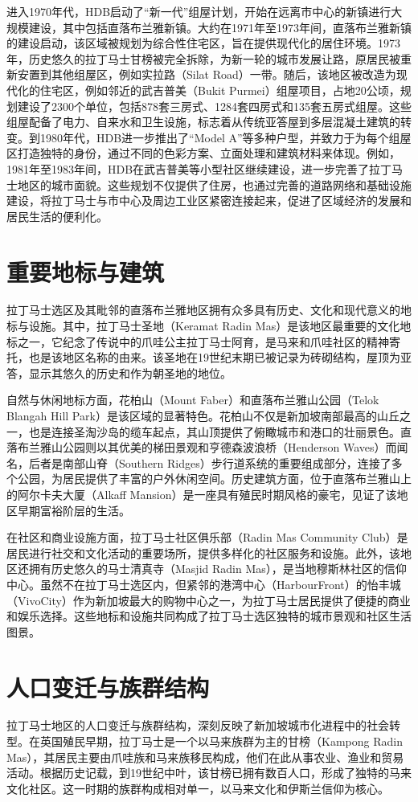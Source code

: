 \documentclass[11pt,a4paper,twoside,openany]{book}
\begin{document}
进入1970年代，HDB启动了“新一代”组屋计划，开始在远离市中心的新镇进行大规模建设，其中包括直落布兰雅新镇。大约在1971年至1973年间，直落布兰雅新镇的建设启动，该区域被规划为综合性住宅区，旨在提供现代化的居住环境。1973年，历史悠久的拉丁马士甘榜被完全拆除，为新一轮的城市发展让路，原居民被重新安置到其他组屋区，例如实拉路（Silat Road）一带。随后，该地区被改造为现代化的住宅区，例如邻近的武吉普美（Bukit Purmei）组屋项目，占地20公顷，规划建设了2300个单位，包括878套三房式、1284套四房式和135套五房式组屋。这些组屋配备了电力、自来水和卫生设施，标志着从传统亚答屋到多层混凝土建筑的转变。到1980年代，HDB进一步推出了“Model A”等多种户型，并致力于为每个组屋区打造独特的身份，通过不同的色彩方案、立面处理和建筑材料来体现。例如，1981年至1983年间，HDB在武吉普美等小型社区继续建设，进一步完善了拉丁马士地区的城市面貌。这些规划不仅提供了住房，也通过完善的道路网络和基础设施建设，将拉丁马士与市中心及周边工业区紧密连接起来，促进了区域经济的发展和居民生活的便利化。

\section{重要地标与建筑}
拉丁马士选区及其毗邻的直落布兰雅地区拥有众多具有历史、文化和现代意义的地标与设施。其中，拉丁马士圣地（Keramat Radin Mas）是该地区最重要的文化地标之一，它纪念了传说中的爪哇公主拉丁马士阿育，是马来和爪哇社区的精神寄托，也是该地区名称的由来。该圣地在19世纪末期已被记录为砖砌结构，屋顶为亚答，显示其悠久的历史和作为朝圣地的地位。

自然与休闲地标方面，花柏山（Mount Faber）和直落布兰雅山公园（Telok Blangah Hill Park）是该区域的显著特色。花柏山不仅是新加坡南部最高的山丘之一，也是连接圣淘沙岛的缆车起点，其山顶提供了俯瞰城市和港口的壮丽景色。直落布兰雅山公园则以其优美的梯田景观和亨德森波浪桥（Henderson Waves）而闻名，后者是南部山脊（Southern Ridges）步行道系统的重要组成部分，连接了多个公园，为居民提供了丰富的户外休闲空间。历史建筑方面，位于直落布兰雅山上的阿尔卡夫大厦（Alkaff Mansion）是一座具有殖民时期风格的豪宅，见证了该地区早期富裕阶层的生活。

在社区和商业设施方面，拉丁马士社区俱乐部（Radin Mas Community Club）是居民进行社交和文化活动的重要场所，提供多样化的社区服务和设施。此外，该地区还拥有历史悠久的马士清真寺（Masjid Radin Mas），是当地穆斯林社区的信仰中心。虽然不在拉丁马士选区内，但紧邻的港湾中心（HarbourFront）的怡丰城（VivoCity）作为新加坡最大的购物中心之一，为拉丁马士居民提供了便捷的商业和娱乐选择。这些地标和设施共同构成了拉丁马士选区独特的城市景观和社区生活图景。

\section{人口变迁与族群结构}
拉丁马士地区的人口变迁与族群结构，深刻反映了新加坡城市化进程中的社会转型。在英国殖民早期，拉丁马士是一个以马来族群为主的甘榜（Kampong Radin Mas），其居民主要由爪哇族和马来族移民构成，他们在此从事农业、渔业和贸易活动。根据历史记载，到19世纪中叶，该甘榜已拥有数百人口，形成了独特的马来文化社区。这一时期的族群构成相对单一，以马来文化和伊斯兰信仰为核心。
\end{document}
